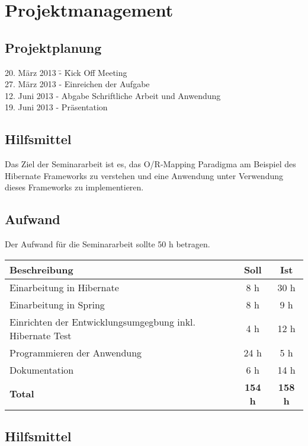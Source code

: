 \chapter{Projektmanagement}
\label{sec:Projektmanagement}

\section{Projektplanung}
\begin{tabbing}
20. März 2013	\= -	\= Kick Off Meeting	\\
27. März 2013	\> -	\> Einreichen der Aufgabe \\
12. Juni 2013	\> -	\> Abgabe Schriftliche Arbeit und Anwendung	\\
19. Juni 2013	\> -	\> Präsentation	\\
\end{tabbing}

\section{Hilfsmittel}
Das Ziel der Seminararbeit ist es, das O/R-Mapping Paradigma am Beispiel des Hibernate Frameworks zu verstehen und eine Anwendung unter Verwendung dieses Frameworks zu implementieren.

\section{Aufwand}
Der Aufwand für die Seminararbeit sollte 50 h betragen. \\

\begin{tabular}{|l|c|c|}
\hline 
\textbf{Beschreibung} & \textbf{Soll}& \textbf{Ist} \\ 
\hline 
Einarbeitung in Hibernate & 8 h & 30 h \\ 
\hline 
Einarbeitung in Spring & 8 h & 9 h \\ 
\hline 
Einrichten der Entwicklungsumgegbung inkl. Hibernate Test & 4 h & 12 h \\ 
\hline 
Programmieren der Anwendung & 24 h & 5 h \\ 
\hline
Dokumentation & 6 h & 14 h \\ 
\hline 
\textbf{Total} & \textbf{154 h} & \textbf{158 h} \\
\hline
\end{tabular}


\section{Hilfsmittel}

